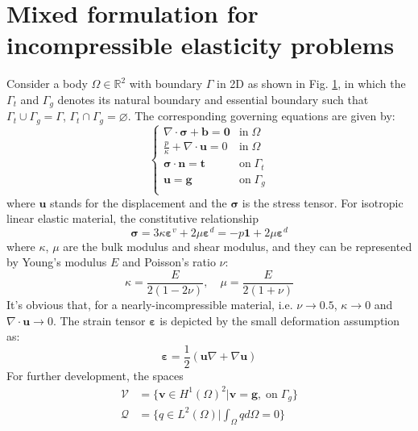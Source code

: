 \section{Mixed formulation for incompressible elasticity problems}
Consider a body $\Omega \in \mathbb R^2$ with boundary $\Gamma$ in 2D as shown in Fig. \ref{}, in which the $\Gamma_t$ and $\Gamma_g$ denotes its natural boundary and essential boundary such that $\Gamma_t \cup \Gamma_g = \Gamma$, $\Gamma_t \cap \Gamma_g = \varnothing$. The corresponding governing equations are given by:
\begin{equation}\label{strong}
\begin{cases}
    \nabla \cdot \boldsymbol \sigma + \boldsymbol b = \boldsymbol 0 & \mathrm{in} \; \Omega \\
    \frac{p}{\kappa} + \nabla \cdot \boldsymbol u = 0 & \mathrm{in} \; \Omega \\
    \boldsymbol \sigma \cdot \boldsymbol n = \boldsymbol t & \mathrm{on} \; \Gamma_t \\
    \boldsymbol u = \boldsymbol g & \mathrm{on} \; \Gamma_g \\
\end{cases}
\end{equation}
where $\boldsymbol u$ stands for the displacement and the $\boldsymbol \sigma$ is the stress tensor. For isotropic linear elastic material, the constitutive relationship 
\begin{equation}
\boldsymbol \sigma = 3\kappa \boldsymbol \varepsilon^v + 2\mu \boldsymbol \varepsilon^d 
= -p \boldsymbol 1 + 2\mu \boldsymbol \varepsilon^d
\end{equation}
where $\kappa$, $\mu$ are the bulk modulus and shear modulus, and they can be represented by Young's modulus $E$ and Poisson's ratio $\nu$:
\begin{equation}
\kappa = \frac{E}{2(1-2\nu)}, \quad \mu = \frac{E}{2(1+\nu)}
\end{equation}
It's obvious that, for a nearly-incompressible material, i.e. $\nu \rightarrow 0.5$, $\kappa \rightarrow 0$ and $\nabla \cdot \boldsymbol u \rightarrow 0$.
The strain tensor $\boldsymbol \varepsilon$ is depicted by the small deformation assumption as:
\begin{equation}
\boldsymbol \varepsilon = \frac{1}{2}(\boldsymbol u \nabla + \nabla \boldsymbol u)
\end{equation}
For further development, the spaces 
\begin{align}
    \mathcal V &= \{\boldsymbol v \in H^1(\Omega)^2 \vert \boldsymbol v = \boldsymbol g, \; \mathrm{on} \; \Gamma_g\} \\
    \mathcal Q &= \{q \in L^2(\Omega) \vert \int_{\Omega} q d\Omega = 0\}
\end{align}
